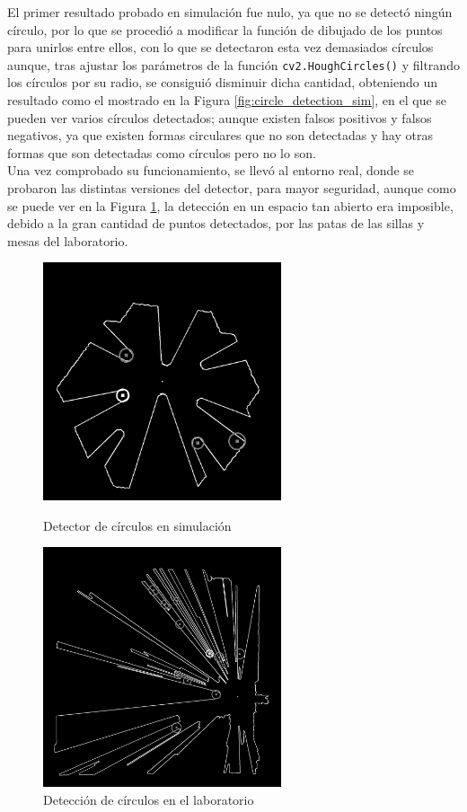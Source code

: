 El primer resultado probado en simulación fue nulo, ya que no se detectó ningún
círculo, por lo que se procedió a modificar la función de dibujado de los puntos
para unirlos entre ellos, con lo que se detectaron esta vez demasiados círculos
aunque, tras ajustar los parámetros de la función \verb|cv2.HoughCircles()| y
filtrando los círculos por su radio, se consiguió disminuir dicha cantidad,
obteniendo un resultado como el mostrado en la Figura
\ref{fig:circle_detection_sim}, en el que se pueden ver varios círculos
detectados; aunque existen falsos positivos y falsos negativos, ya que existen
formas circulares que no son detectadas y hay otras formas que son detectadas
como círculos pero no lo son.
\\

Una vez comprobado su funcionamiento, se llevó al entorno real, donde se
probaron las distintas versiones del detector, para mayor seguridad, aunque como
se puede ver en la Figura \ref{fig:circle_detection_lab}, la detección en un
espacio tan abierto era imposible, debido a la gran cantidad de puntos
detectados, por las patas de las sillas y mesas del laboratorio.

\begin{figure}[h!]
  \centering
  \begin{minipage}{0.45\textwidth}
    \centering
    \includegraphics[width=7cm]{figs/circle_detection_sim}
    \caption{Detector de círculos en simulación}
    \label{fig:circle_detection_sim}
  \end{minipage}
  \hfill
  \begin{minipage}{0.45\textwidth}
    \centering
    \includegraphics[width=7cm]{figs/circle_detection_lab}
    \caption{Detección de círculos en el laboratorio}
    \label{fig:circle_detection_lab}
  \end{minipage}
\end{figure}\

